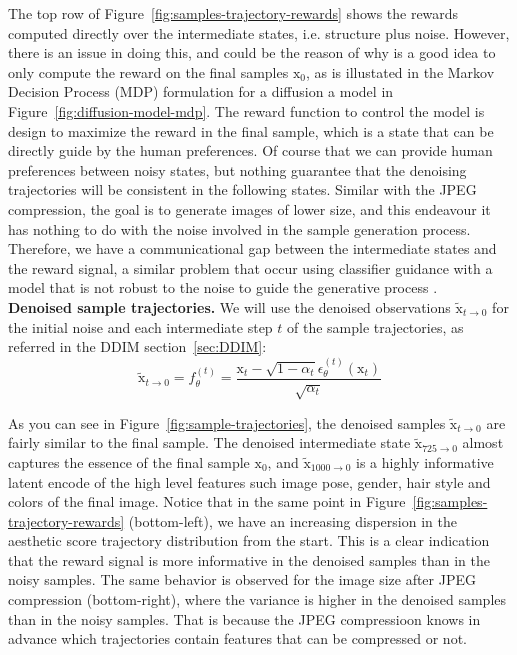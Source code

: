 \noindent The top row of Figure~\ref{fig:samples-trajectory-rewards} shows the rewards computed directly over the intermediate states, i.e. structure plus noise. However, there is an issue in doing this, and could be the reason of why is a good idea to only compute the reward on the final samples $\mathrm{x}_{0}$, as is illustated in the Markov
Decision Process (MDP) formulation for a diffusion a model in Figure~\ref{fig:diffusion-model-mdp}. The reward function to control the model is design to maximize the reward in the final sample, which is a state that can be directly guide by the human preferences. Of course that we can 
provide human preferences between noisy states, but nothing guarantee that
the denoising trajectories will be consistent in the following states. Similar with the JPEG compression, the goal is to generate images of lower size, and
this endeavour it has nothing to do with the noise involved in the sample generation process. Therefore, we have a communicational gap between the intermediate states and the reward signal, a similar problem that occur using
classifier guidance with a model that is not robust to the noise to guide
the generative process \cite{bansal2023universal}. \\

\noindent \noindent \textbf{Denoised sample trajectories.} We will use the denoised observations $\tilde{\mathrm{x}}_{t\rightarrow 0}$ for the initial
noise and each intermediate step $t$ of the sample trajectories, as referred in the DDIM section~\ref{sec:DDIM}:
\begin{equation}\label{eqn:ddim-predicted-sample}
  \tilde{\mathrm{x}}_{t\rightarrow0}=f_{\theta}^{(t)}=\frac{\mathrm{x}_{t}-\sqrt{1-\alpha_{t}}\epsilon_{\theta}^{(t)}(\mathrm{x}_{t})}{\sqrt{\alpha_{t}}}
\end{equation}

\noindent As you can see in Figure~\ref{fig:sample-trajectories}, the denoised samples $\tilde{\mathrm{x}}_{t\rightarrow0}$ are fairly similar to the
final sample. The denoised intermediate state $\tilde{\mathrm{x}}_{725\rightarrow0}$ almost captures the essence of the final sample $\mathrm{x}_{0}$, and $\tilde{\mathrm{x}}_{1000\rightarrow0}$ is a highly informative latent encode of the high level features such image pose, gender, hair style and colors of the final image. Notice that in the same point in Figure~\ref{fig:samples-trajectory-rewards} (bottom-left), we have an increasing dispersion in the aesthetic score trajectory distribution from the start. This is a clear indication that the reward signal is more informative in the denoised samples than in the noisy samples. The same behavior is observed for the image size after JPEG compression (bottom-right), where the variance is higher in the denoised samples than in the noisy samples. That is because the
JPEG compressioon knows in advance which trajectories contain features that can be compressed or not.

